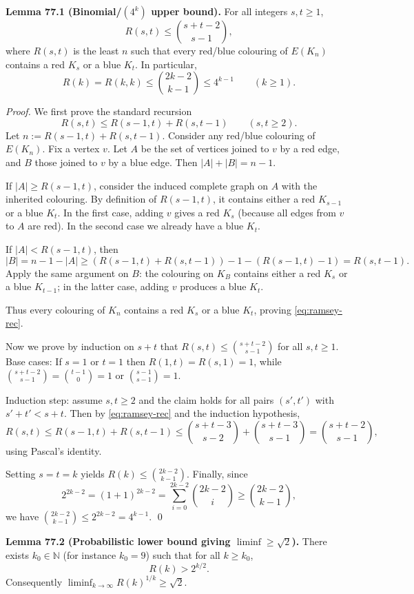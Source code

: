 \medskip
\noindent\textbf{Lemma 77.1 (Binomial/$(4^{k})$ upper bound).}
For all integers $s,t\ge 1$,
\[
R(s,t)\le \binom{s+t-2}{s-1},
\]
where $R(s,t)$ is the least $n$ such that every red/blue colouring of $E(K_n)$ contains a red $K_s$ or a blue $K_t$. In particular,
\[
R(k)=R(k,k)\le \binom{2k-2}{k-1}\le 4^{k-1}\qquad (k\ge 1).
\]

\emph{Proof.}
We first prove the standard recursion
\begin{equation}\label{eq:ramsey-rec}
R(s,t)\le R(s-1,t)+R(s,t-1)\qquad (s,t\ge 2).
\end{equation}
Let $n:=R(s-1,t)+R(s,t-1)$. Consider any red/blue colouring of $E(K_n)$. Fix a vertex $v$. Let $A$ be the set of vertices joined to $v$ by a red edge, and $B$ those joined to $v$ by a blue edge. Then $|A|+|B|=n-1$.

If $|A|\ge R(s-1,t)$, consider the induced complete graph on $A$ with the inherited colouring. By definition of $R(s-1,t)$, it contains either a red $K_{s-1}$ or a blue $K_t$. In the first case, adding $v$ gives a red $K_s$ (because all edges from $v$ to $A$ are red). In the second case we already have a blue $K_t$.

If $|A|<R(s-1,t)$, then
\[
|B|=n-1-|A|\ge (R(s-1,t)+R(s,t-1))-1-(R(s-1,t)-1)=R(s,t-1).
\]
Apply the same argument on $B$: the colouring on $K_B$ contains either a red $K_s$ or a blue $K_{t-1}$; in the latter case, adding $v$ produces a blue $K_t$.

Thus every colouring of $K_n$ contains a red $K_s$ or a blue $K_t$, proving \eqref{eq:ramsey-rec}.

Now we prove by induction on $s+t$ that $R(s,t)\le \binom{s+t-2}{s-1}$ for all $s,t\ge 1$.
Base cases: If $s=1$ or $t=1$ then $R(1,t)=R(s,1)=1$, while $\binom{s+t-2}{s-1}=\binom{t-1}{0}=1$ or $\binom{s-1}{s-1}=1$.

Induction step: assume $s,t\ge 2$ and the claim holds for all pairs $(s',t')$ with $s'+t'<s+t$. Then by \eqref{eq:ramsey-rec} and the induction hypothesis,
\[
R(s,t)\le R(s-1,t)+R(s,t-1)\le \binom{s+t-3}{s-2}+\binom{s+t-3}{s-1}=\binom{s+t-2}{s-1},
\]
using Pascal's identity.

Setting $s=t=k$ yields $R(k)\le \binom{2k-2}{k-1}$. Finally, since
\[
2^{2k-2}=(1+1)^{2k-2}=\sum_{i=0}^{2k-2}\binom{2k-2}{i}\ge \binom{2k-2}{k-1},
\]
we have $\binom{2k-2}{k-1}\le 2^{2k-2}=4^{k-1}$. \qed

\medskip
\noindent\textbf{Lemma 77.2 (Probabilistic lower bound giving $\liminf\ge\sqrt2$).}
There exists $k_0\in\mathbb{N}$ (for instance $k_0=9$) such that for all $k\ge k_0$,
\[
R(k) > 2^{k/2}.
\]
Consequently $\liminf_{k\to\infty} R(k)^{1/k} \ge \sqrt2$.

